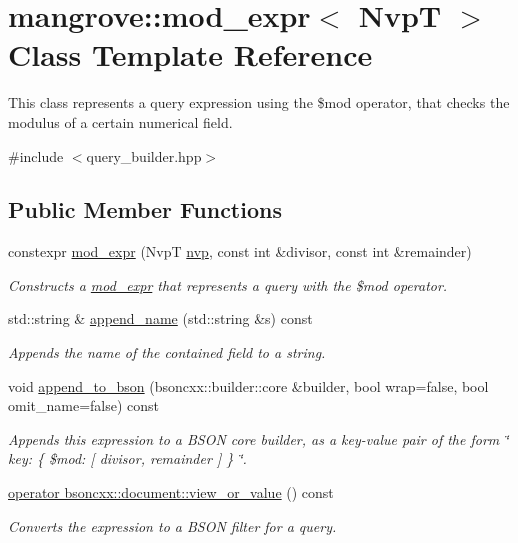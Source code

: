 \hypertarget{classmangrove_1_1mod__expr}{}\section{mangrove\+:\+:mod\+\_\+expr$<$ NvpT $>$ Class Template Reference}
\label{classmangrove_1_1mod__expr}


This class represents a query expression using the \$mod operator, that checks the modulus of a certain numerical field.  




{\ttfamily \#include $<$query\+\_\+builder.\+hpp$>$}

\subsection*{Public Member Functions}
\begin{DoxyCompactItemize}
\item 
constexpr \hyperlink{classmangrove_1_1mod__expr_aeed73f6f483586789bd8d6910c394a70}{mod\+\_\+expr} (NvpT \hyperlink{classmangrove_1_1nvp}{nvp}, const int \&divisor, const int \&remainder)
\begin{DoxyCompactList}\small\item\em Constructs a \hyperlink{classmangrove_1_1mod__expr}{mod\+\_\+expr} that represents a query with the \$mod operator. \end{DoxyCompactList}\item 
std\+::string \& \hyperlink{classmangrove_1_1mod__expr_a72cd731ea3c43dbf0798adf1f222f59b}{append\+\_\+name} (std\+::string \&s) const \hypertarget{classmangrove_1_1mod__expr_a72cd731ea3c43dbf0798adf1f222f59b}{}\label{classmangrove_1_1mod__expr_a72cd731ea3c43dbf0798adf1f222f59b}

\begin{DoxyCompactList}\small\item\em Appends the name of the contained field to a string. \end{DoxyCompactList}\item 
void \hyperlink{classmangrove_1_1mod__expr_a109ded32f02e7da37c21422092945a20}{append\+\_\+to\+\_\+bson} (bsoncxx\+::builder\+::core \&builder, bool wrap=false, bool omit\+\_\+name=false) const 
\begin{DoxyCompactList}\small\item\em Appends this expression to a B\+S\+ON core builder, as a key-\/value pair of the form \char`\"{} key\+: \{ \$mod\+: \mbox{[} divisor, remainder \mbox{]} \} \char`\"{}. \end{DoxyCompactList}\item 
\hyperlink{classmangrove_1_1mod__expr_ade5c98722cadb244629cfd4df42d4631}{operator bsoncxx\+::document\+::view\+\_\+or\+\_\+value} () const 
\begin{DoxyCompactList}\small\item\em Converts the expression to a B\+S\+ON filter for a query. \end{DoxyCompactList}\end{DoxyCompactItemize}


